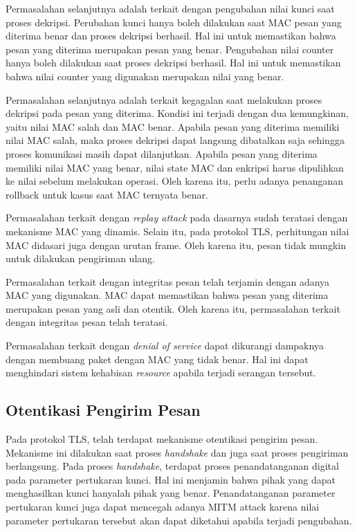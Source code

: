 Permasalahan selanjutnya adalah terkait dengan pengubahan nilai kunci saat proses dekripsi. Perubahan kunci hanya boleh dilakukan saat MAC pesan yang diterima benar dan proses dekripsi berhasil. Hal ini untuk memastikan bahwa pesan yang diterima merupakan pesan yang benar. Pengubahan nilai counter hanya boleh dilakukan saat proses dekripsi berhasil. Hal ini untuk memastikan bahwa nilai counter yang digunakan merupakan nilai yang benar.

Permasalahan selanjutnya adalah terkait kegagalan saat melakukan proses dekripsi pada pesan yang diterima. Kondisi ini terjadi dengan dua kemungkinan, yaitu nilai MAC salah dan MAC benar. Apabila pesan yang diterima memiliki nilai MAC salah, maka proses dekripsi dapat langsung dibatalkan saja sehingga proses komunikasi masih dapat dilanjutkan. Apabila pesan yang diterima memiliki nilai MAC yang benar, nilai state MAC dan enkripsi harus dipulihkan ke nilai sebelum melakukan operasi. Oleh karena itu, perlu adanya penanganan rollback untuk kasus saat MAC ternyata benar.

Permasalahan terkait dengan \emph{replay attack} pada dasarnya sudah teratasi dengan mekanisme MAC yang dinamis. Selain itu, pada protokol TLS, perhitungan nilai MAC didasari juga dengan urutan frame. Oleh karena itu, pesan tidak mungkin untuk dilakukan pengiriman ulang.

Permasalahan terkait dengan integritas pesan telah terjamin dengan adanya MAC yang digunakan. MAC dapat memastikan bahwa pesan yang diterima merupakan pesan yang asli dan otentik. Oleh karena itu, permasalahan terkait dengan integritas pesan telah teratasi.

Permasalahan terkait dengan \emph{denial of service} dapat dikurangi dampaknya dengan membuang paket dengan MAC yang tidak benar. Hal ini dapat menghindari sistem kehabisan \emph{resource} apabila terjadi serangan tersebut.

\subsection{Otentikasi Pengirim Pesan}

Pada protokol TLS, telah terdapat mekanisme otentikasi pengirim pesan. Mekanisme ini dilakukan saat proses \emph{handshake} dan juga saat proses pengiriman berlangsung. Pada proses \emph{handshake}, terdapat proses penandatanganan digital pada parameter pertukaran kunci. Hal ini menjamin bahwa pihak yang dapat menghasilkan kunci hanyalah pihak yang benar. Penandatanganan parameter pertukaran kunci juga dapat mencegah adanya MITM attack karena nilai parameter pertukaran tersebut akan dapat diketahui apabila terjadi pengubahan.

